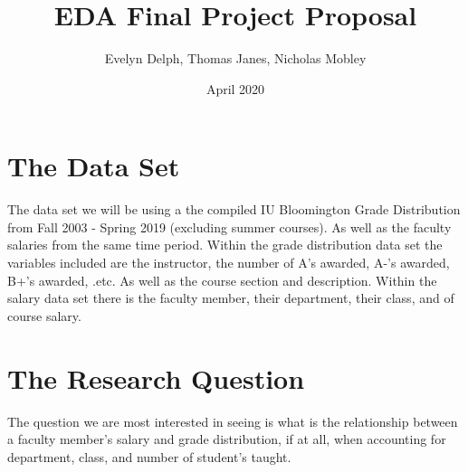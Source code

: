 \documentclass{article}
\title{EDA Final Project Proposal}
\author{Evelyn Delph, Thomas Janes, Nicholas Mobley }
\date{April 2020}
\begin{document}
\maketitle

\section{The Data Set}
The data set we will be using a the compiled IU Bloomington Grade Distribution
from Fall 2003 - Spring 2019 (excluding summer courses). As well as the 
faculty salaries from the same time period. Within the grade distribution
data set the variables included are the instructor, the number of A's awarded, A-'s awarded, B+'s awarded, .etc. As well as the course section and description. Within the salary data set there is the faculty member, their department, their class, and of course salary. 

\maketitle

\section{The Research Question}

The question we are most interested in seeing is what is the relationship 
between a faculty member's salary and grade distribution, if at all, when accounting for department, class, and number of student's taught.
\end{document}
